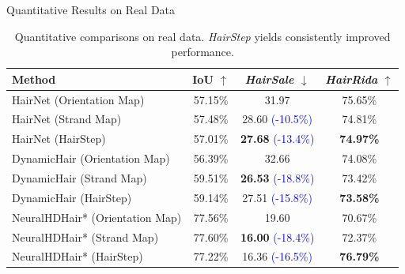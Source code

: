 \begin{frame}[t]{Quantitative Results on Real Data}
    \begin{table}[h]
        \centering
        \small
        \renewcommand{\arraystretch}{1.4}
        \begin{tabular}{l|c|c|c}
            \hline
            \rowcolor{myLightBlue}
            Method & IoU $\uparrow$ & \emph{HairSale} $\downarrow$ & \emph{HairRida} $\uparrow$ \\
            \hline
            HairNet (Orientation Map) & 57.15\% & 31.97 & 75.65\% \\
            HairNet (Strand Map) & 57.48\% & 28.60 \textcolor{blue}{(-10.5\%)} & 74.81\% \\
            HairNet (HairStep) & 57.01\% & \textbf{27.68} \textcolor{blue}{(-13.4\%)} & \textbf{74.97\%} \\
            \hline
            DynamicHair (Orientation Map) & 56.39\% & 32.66 & 74.08\% \\
            DynamicHair (Strand Map) & 59.51\% & \textbf{26.53} \textcolor{blue}{(-18.8\%)} & 73.42\% \\
            DynamicHair (HairStep) & 59.14\% & 27.51 \textcolor{blue}{(-15.8\%)} & \textbf{73.58\%} \\
            \hline
            NeuralHDHair* (Orientation Map) & 77.56\% & 19.60 & 70.67\% \\
            NeuralHDHair* (Strand Map) & 77.60\% & \textbf{16.00} \textcolor{blue}{(-18.4\%)} & 72.37\% \\
            NeuralHDHair* (HairStep) & 77.22\% & 16.36 \textcolor{blue}{(-16.5\%)} & \textbf{76.79\%} \\
            \hline
        \end{tabular}
        \caption{Quantitative comparisons on real data. \emph{HairStep} yields consistently improved performance.}
        \label{tab:representation_effectiveness_real}
    \end{table}
\end{frame}

